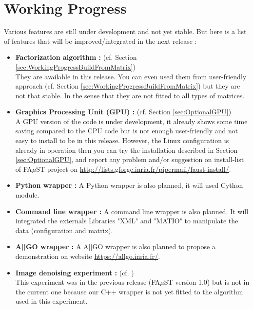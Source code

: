 \chapter{Working Progress}\label{sec:WorkingProgress}
	Various features are still under development and not yet stable.
But here is a list of features that will be improved/integrated in the next release :
\begin{itemize}
	\item \textbf{Factorization algorithm :} (cf. Section \ref{sec:WorkingProgressBuildFromMatrix})\\ 
They are available in this release. You can even used them
from user-friendly approach (cf. Section \ref{sec:WorkingProgressBuildFromMatrix}) but they are not
that stable. In the sense that they are not fitted to all types of matrices.
	\item \textbf{Graphics Processing Unit (GPU) :} (cf. Section \ref{sec:OptionalGPU})\\
A GPU version of the code is under development, it already shows 
some time saving compared to the CPU code but is not enough user-friendly and not easy to install to be in this release. However, the Linux configuration is already in operation then you can try the installation described in Section \ref{sec:OptionalGPU}, and report any problem and/or suggestion on install-list of FA$\mu$ST project on \url{http://lists.gforge.inria.fr/pipermail/faust-install/}. 
	\item \textbf{Python wrapper :} A Python wrapper is also planned, it will used Cython module.
	\item \textbf{Command line wrapper :} A command line wrapper is also planned. It will integrated the externals Libraries "XML" and "MATIO" to manipulate the data (configuration and matrix). 
	\item \textbf{A||GO wrapper :} A A||GO wrapper is also planned to propose a demonstration on website \url{https://allgo.inria.fr/}.
		
	\item \textbf{Image denoising experiment :} (cf. \cite[chapter VI.]{LeMagoarou2016}) \\
This experiment was in the previous release (FA$\mu$ST version 1.0) but is not in the current one because our C++ wrapper is not yet fitted to the algorithm used in this experiment.    
\end{itemize}

